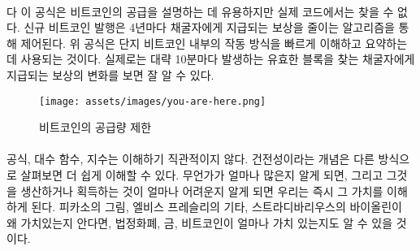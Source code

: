 \paragraph{}
\begin{comment}	
	While this formula is useful to describe Bitcoin's supply, it is actually
	nowhere to be found in the code. Issuance of new bitcoin is done in an
	algorithmically controlled fashion, by reducing the reward which is paid to
	miners every four years~\cite{btcwiki:supply}. The formula above is used to
	quickly sum up what is happening under the hood. What really happens can be best
	seen by looking at the change in block reward, the reward paid out to whoever
	finds a valid block, which roughly happens every 10 minutes.
\end{comment}다
이 공식은 비트코인의 공급을 설명하는 데 유용하지만 실제 코드에서는 찾을 수 없다. 
신규 비트코인 발행은 4년마다 채굴자에게 지급되는 보상을 줄이는 알고리즘을 통해 제어된다.\cite{btcwiki:supply}
위 공식은 단지 비트코인 내부의 작동 방식을 빠르게 이해하고 요약하는 데 사용되는 것이다. 
실제로는 대략 10분마다 발생하는 유효한 블록을 찾는 채굴자에게 지급되는 보상의 변화를 보면 잘 알 수 있다.

\begin{figure}
	\texttt{[image: assets/images/you-are-here.png]}
	\caption{비트코인의 공급량 제한}
	\label{fig:you-are-here.png}
\end{figure}

\paragraph{}
\begin{comment}	
	Formulas, logarithmic functions and exponentials are not exactly
	intuitive to understand. The concept of \textit{soundness} might be easier to
	understand if looked at in another way. Once we know how much there is
	of something, and once we know how hard this something is to produce or
	get our hands on, we immediately understand its value. What is true for
	Picasso's paintings, Elvis Presley's guitars, and Stradivarius violins
	is also true for fiat currency, gold, and bitcoins.
\end{comment}
공식, 대수 함수, 지수는 이해하기 직관적이지 않다. 
건전성이라는 개념은 다른 방식으로 살펴보면 더 쉽게 이해할 수 있다.
무언가가 얼마나 많은지 알게 되면, 그리고 그것을 생산하거나 획득하는 것이 얼마나 어려운지 알게 되면 
우리는 즉시 그 가치를 이해하게 된다. 
피카소의 그림, 엘비스 프레슬리의 기타, 스트라디바리우스의 바이올린이 왜 가치있는지 안다면,
법정화폐, 금, 비트코인이 얼마나 가치 있는지도 알 수 있을 것이다.

